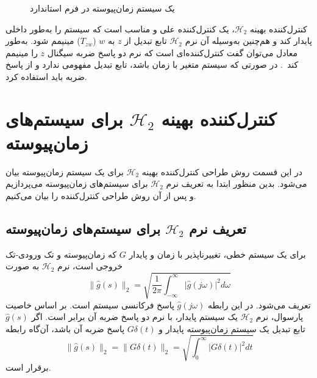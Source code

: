 \setlength{\unitlength}{1cm}
\begin{figure}[b]
\centering
{}
\caption{یک سیستم زمان‌پیوسته در فرم استاندارد}
\label{pic2-2}
\end{figure} 


کنترل‌کننده بهینه $\mathcal{H}_2$، یک کنترل‌کننده علی و مناسب است که سیستم را به‌طور داخلی پایدار کند و هم‌چنین به‌وسیله آن نرم $\mathcal{H}_2$ تابع تبدیل از  $z$ به $w$ ($T_{zw}$) مینیمم شود. به‌طور معادل می‌توان گفت کنترل‌کننده‌ای است که نرم دو پاسخ ضربه سیگنال  $z$ را مینیمم کند~\cite{paper_4}. در صورتی که سیستم متغیر با زمان باشد، تابع تبدیل مفهومی ندارد و از پاسخ ضربه باید استفاده کرد.  

\section{کنترل‌کننده بهینه $\mathcal{H}_2$ برای سیستم‌های زمان‌پیوسته}
در این قسمت روش طراحی کنترل‌کننده بهینه $\mathcal{H}_2$ برای یک سیستم زمان‌پیوسته بیان می‌شود. بدین منظور ابتدا به تعریف نرم $\mathcal{H}_2$ برای سیستم‌های زمان‌پیوسته می‌پردازیم و پس از آن روش طراحی کنترل‌کننده را بیان می‌کنیم.
\subsection{تعریف نرم $\mathcal{H}_2$ برای سیستم‌های زمان‌پیوسته} 
برای یک سیستم خطی، تغییرناپذیر با زمان و پایدار $G$ که زمان‌پیوسته و تک ورودی-تک خروجی است، نرم $\mathcal{H}_2$ به صورت 
\newcommand{\norm}[1]{\lVert#1\lVert}
\begin{equation}
\norm{\hat{g}(s)}_{2}=\sqrt{\dfrac{1}{2\pi}\int_{-\infty}^{\infty}{{\vert \hat{g}(j\omega)\vert}^2}d\omega} 
\label{eq2-1}
\end{equation}
تعریف می‌شود. در این رابطه $\hat{g}(j\omega) $ پاسخ فرکانسی سیستم است. بر اساس خاصیت پارسوال،  نرم $\mathcal{H}_2$ یک سیستم پایدار، با نرم دو پاسخ ضربه آن برابر است. 
اگر 
$\hat{g}(s)$
تابع تبدیل یک سیستم زمان‌پیوسته پایدار و
$G\delta(t)$
پاسخ ضربه آن باشد، آن‌گاه رابطه
\begin{equation}
\norm{\hat{g}(s)}_{2}=\norm{G\delta(t)}_{2} = \sqrt{\int_{0}^{\infty}{{\vert G\delta(t)\vert}^2}d t} 
\label{eq2-2}
\end{equation}
برقرار است.

